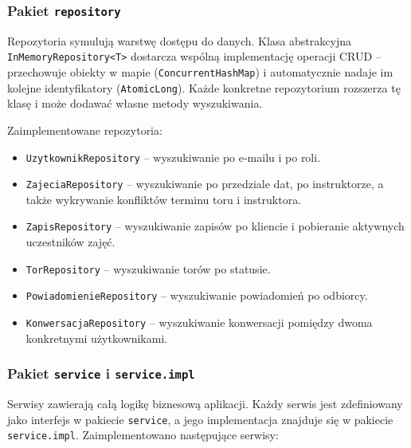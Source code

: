 \documentclass[a4paper,12pt]{article}
\begin{document}
\subsubsection*{Pakiet \texttt{repository}}

Repozytoria symulują warstwę dostępu do danych. Klasa abstrakcyjna \texttt{InMemoryRepository<T>} dostarcza wspólną implementację operacji CRUD -- przechowuje obiekty w mapie (\texttt{ConcurrentHashMap}) i automatycznie nadaje im kolejne identyfikatory (\texttt{AtomicLong}). Każde konkretne repozytorium rozszerza tę klasę i może dodawać własne metody wyszukiwania.

Zaimplementowane repozytoria:

\begin{itemize}
    \item \texttt{UzytkownikRepository} -- wyszukiwanie po e-mailu i po roli.
    \item \texttt{ZajeciaRepository} -- wyszukiwanie po przedziale dat, po instruktorze, a także wykrywanie konfliktów terminu toru i instruktora.
    \item \texttt{ZapisRepository} -- wyszukiwanie zapisów po kliencie i pobieranie aktywnych uczestników zajęć.
    \item \texttt{TorRepository} -- wyszukiwanie torów po statusie.
    \item \texttt{PowiadomienieRepository} -- wyszukiwanie powiadomień po odbiorcy.
    \item \texttt{KonwersacjaRepository} -- wyszukiwanie konwersacji pomiędzy dwoma konkretnymi użytkownikami.
\end{itemize}

\subsubsection*{Pakiet \texttt{service} i \texttt{service.impl}}

Serwisy zawierają całą logikę biznesową aplikacji. Każdy serwis jest zdefiniowany jako interfejs w pakiecie \texttt{service}, a jego implementacja znajduje się w pakiecie \texttt{service.impl}. Zaimplementowano następujące serwisy:
\end{document}
